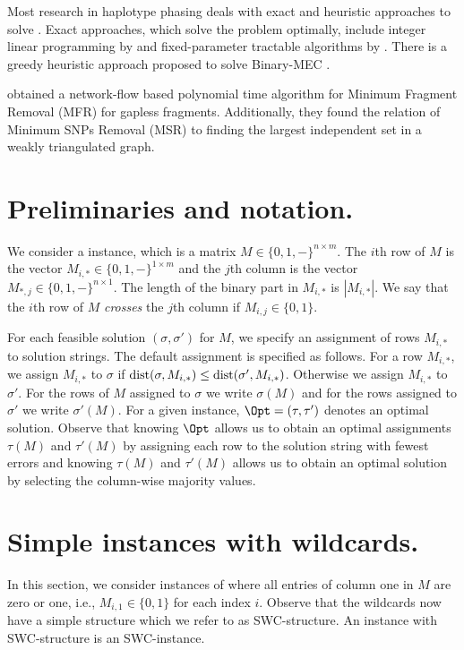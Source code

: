 Most research in haplotype phasing deals with exact and heuristic approaches to solve \BMEC.
Exact approaches, which solve the problem optimally, include integer linear programming by \cite{Fouilhoux2012} and fixed-parameter tractable algorithms by \cite{he2010optimal, Pirola2015}.
There is a greedy heuristic approach proposed to solve Binary-MEC \citep{Bansal2008}. 

\cite{Lancia2001} obtained a network-flow based polynomial time algorithm for Minimum Fragment Removal (MFR) for gapless fragments.
Additionally, they found the relation of Minimum SNPs Removal (MSR) to finding the largest independent set in a weakly triangulated graph.

\section{Preliminaries and notation.}\label{sec:prelim}
We consider a \GMEC instance, which is a matrix $M \in \{0,1, -\}^{n \times m}$.
The $i$th row of $M$ is the vector $M_{i,*} \in \{0,1, -\}^{1 \times m}$ and the $j$th column is the vector $M_{*,j} \in \{0,1, -\}^{n \times 1}$.
The length of the binary part in $M_{i,*}$ is $|M_{i,*}|$. 
We say that the $i$th row of $M$ \emph{crosses} the $j$th column if $M_{i,j} \in \{0,1\}$.

For each feasible solution $(\sigma,\sigma')$ for $M$, we specify an assignment of rows $M_{i,*}$ to solution strings.
The default assignment is specified as follows.
For a row $M_{i,*}$, we assign $M_{i,*}$ to $\sigma$ if $\mathrm{dist}(\sigma,M_{i,*}) \le \mathrm{dist}(\sigma',M_{i,*})$.
Otherwise we assign $M_{i,*}$ to $\sigma'$.
For the rows of $M$ assigned to $\sigma$ we write $\sigma(M)$ and for the rows assigned to $\sigma'$ we write $\sigma'(M)$.
For a given instance, $\Opt = (\tau, \tau')$ denotes an optimal solution.
Observe that knowing $\Opt$ allows us to obtain an optimal assignments $\tau(M)$ and $\tau'(M)$ by assigning each row to the solution string with fewest errors and knowing $\tau(M)$ and $\tau'(M)$ allows us to obtain an optimal solution by selecting the column-wise majority values.

\section{Simple instances with wildcards.}\label{sec:swc}
In this section, we consider instances of \GMEC where all entries of column one in $M$ are zero or one, i.e., $M_{i,1} \in \{0,1\}$ for each index $i$.
Observe that the wildcards now have a simple structure which we refer to as SWC-structure.
An instance with SWC-structure is an SWC-instance.

